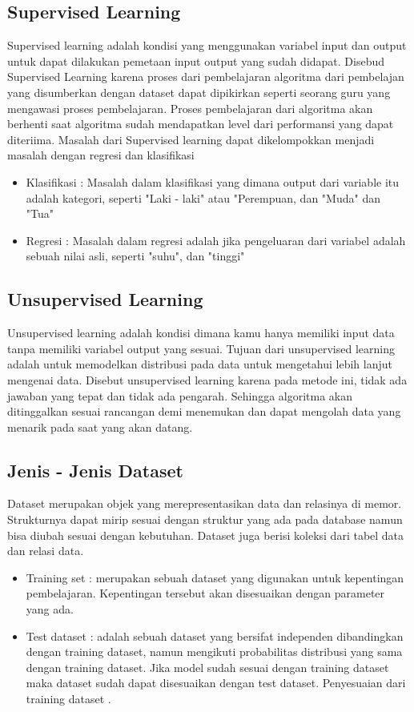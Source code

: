 \subsection{Supervised Learning}
Supervised learning adalah kondisi yang menggunakan variabel input dan output untuk dapat dilakukan pemetaan input output yang sudah didapat. Disebud Supervised Learning karena proses dari pembelajaran algoritma dari pembelajan yang disumberkan dengan dataset dapat dipikirkan seperti seorang guru yang mengawasi proses pembelajaran. Proses pembelajaran dari algoritma akan berhenti saat algoritma sudah mendapatkan level dari performansi yang dapat diteriima.
\hfill\break
Masalah dari Supervised learning dapat dikelompokkan menjadi masalah dengan regresi dan klasifikasi
\begin{itemize}
	\item Klasifikasi : Masalah dalam klasifikasi yang dimana output dari variable itu adalah kategori, seperti "Laki - laki" atau "Perempuan, dan "Muda" dan "Tua"
	\item Regresi : Masalah dalam regresi adalah jika pengeluaran dari variabel adalah sebuah nilai asli, seperti "suhu", dan "tinggi"
\end{itemize}

\subsection{Unsupervised Learning}
Unsupervised learning adalah kondisi dimana kamu hanya memiliki input data tanpa memiliki variabel output yang sesuai. Tujuan dari unsupervised learning adalah untuk memodelkan distribusi pada data untuk mengetahui lebih lanjut mengenai data. Disebut unsupervised learning karena pada metode ini, tidak ada jawaban yang tepat dan tidak ada pengarah. Sehingga algoritma akan ditinggalkan sesuai rancangan demi menemukan dan dapat mengolah data yang menarik pada saat yang akan datang. 

\subsection{Jenis - Jenis Dataset}
Dataset merupakan objek yang merepresentasikan data dan relasinya di memor. Strukturnya dapat mirip sesuai dengan struktur yang ada pada database namun bisa diubah sesuai dengan kebutuhan. Dataset juga berisi koleksi dari tabel data dan relasi data.
\begin{itemize}
	\item Training set : merupakan sebuah dataset yang digunakan untuk kepentingan pembelajaran. Kepentingan tersebut akan disesuaikan dengan parameter yang ada. 
	\item Test dataset : adalah sebuah dataset yang bersifat independen dibandingkan dengan training dataset, namun mengikuti probabilitas distribusi yang sama dengan training dataset. Jika model sudah sesuai dengan training dataset maka dataset sudah dapat disesuaikan dengan test dataset. Penyesuaian dari training dataset .
\end{itemize}

